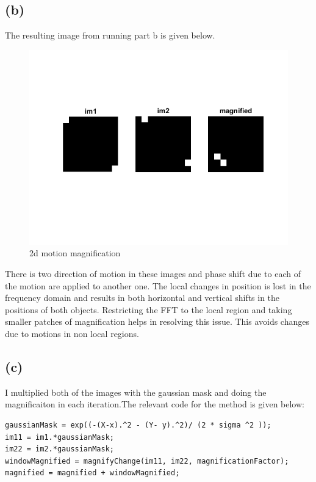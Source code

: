 \documentclass[12pt,letterpaper]{article}
\begin{document}
	\subsection*{(b)}
	The resulting image from running part b is given below.
	\begin{figure}[htbp]
		\includegraphics{partb.png}
		\caption{2d motion magnification}
	\end{figure}
There is two direction of motion in these images and phase shift due to each of the motion are applied to another one. The local changes in position is lost in the frequency domain and results in both horizontal and vertical shifts in the positions of both objects. 
Restricting the FFT to the local region and taking smaller patches of magnification helps in resolving this issue. This avoids changes due to motions in non local regions.
	\subsection*{(c)}
	I multiplied both of the images with the gaussian mask and doing the magnificaiton in each iteration.The relevant code for the method is given below:
	
\begin{lstlisting}
gaussianMask = exp((-(X-x).^2 - (Y- y).^2)/ (2 * sigma ^2 ));
im11 = im1.*gaussianMask;
im22 = im2.*gaussianMask;
windowMagnified = magnifyChange(im11, im22, magnificationFactor);
magnified = magnified + windowMagnified;

\end{lstlisting}
\end{document}
